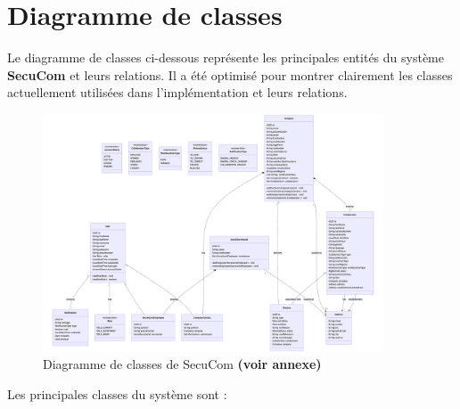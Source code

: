 \section{Diagramme de classes}

\noindent Le diagramme de classes ci-dessous représente les principales entités du système \textbf{SecuCom} et leurs relations. Il a été optimisé pour montrer clairement les classes actuellement utilisées dans l'implémentation et leurs relations.

\begin{figure}[H]
\centering
\includegraphics[width=0.9\textwidth]{ClassDiagram.png}
\caption{Diagramme de classes de SecuCom \textbf{(voir annexe)}}
\end{figure}

\vspace{0.5cm}

\noindent Les principales classes du système sont :

